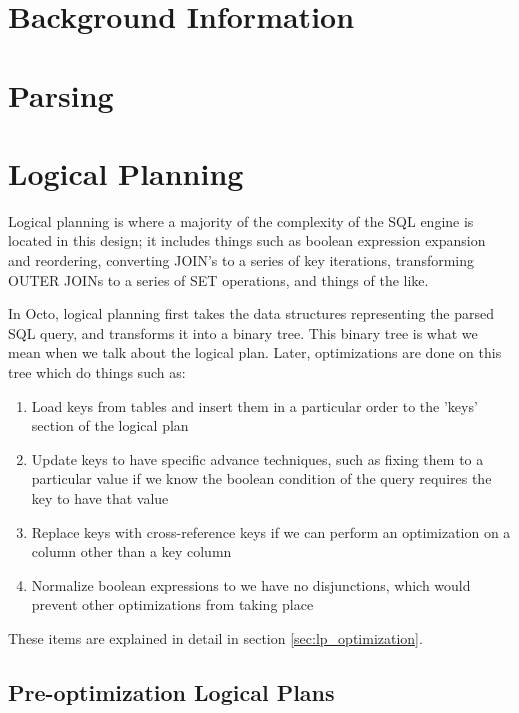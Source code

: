 \documentclass[]{article}
\begin{document}
\section{Background Information}

\section{Parsing} \label{sec:parsing}


\section{Logical Planning}

Logical planning is where a majority of the complexity of the SQL engine is located in this design; it includes things such as boolean expression expansion and reordering, converting JOIN's to a series of key iterations, transforming OUTER JOINs to a series of SET operations, and things of the like.

In Octo, logical planning first takes the data structures representing the parsed SQL query, and transforms it into a binary tree.
This binary tree is what we mean when we talk about the logical plan.
Later, optimizations are done on this tree which do things such as:

\begin{enumerate}
	\item Load keys from tables and insert them in a particular order to the 'keys' section of the logical plan
	\item Update keys to have specific advance techniques, such as fixing them to a particular value if we know the boolean condition of the query requires the key to have that value
	\item Replace keys with cross-reference keys if we can perform an optimization on a column other than a key column
	\item Normalize boolean expressions to we have no disjunctions, which would prevent other optimizations from taking place
\end{enumerate}

These items are explained in detail in section \ref{sec:lp_optimization}.

\subsection{Pre-optimization Logical Plans}
\end{document}
